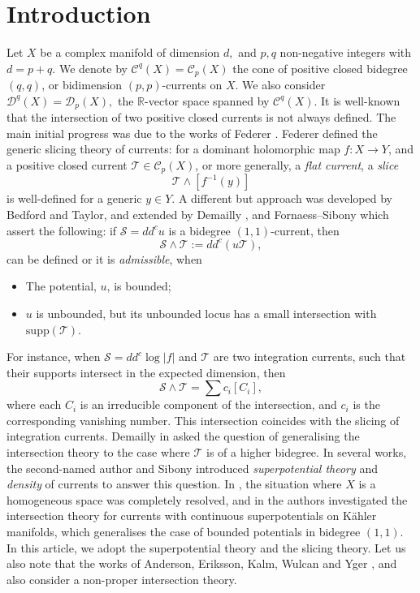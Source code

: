 \documentclass[11pt]{amsart}
\theoremstyle{definition}
\newcommand{\R}{\mathbb{R}}
\newcommand{\lto}{\longrightarrow}
\newcommand{\sD}{\mathscr{D}}
\newcommand{\sC}{\mathscr{C}}
\newcommand{\cC}{\mathcal{C}}
\newcommand{\sT}{\mathscr{T}}
\newcommand{\sS}{\mathscr{S}}
\newcommand{\supp}[1]{{\mathrm{supp}(#1)}}
\begin{document}
\section{Introduction}
Let $X$ be a complex manifold of dimension $d,$ and $p,q$ non-negative integers with $d= p+q.$ We denote by $\cC^{q}(X)= \cC_{p}(X)$ the cone of positive closed bidegree $(q,q)$, or bidimension $(p,p)$-currents on $X.$ We also consider $\sD^q(X) = \sD_p(X),$ the $\R$-vector space spanned by $\sC^q(X).$ It is well-known that the intersection of two positive closed currents is not always defined. The main initial progress was due to the works of Federer \cite{Federer}. Federer defined the generic slicing theory of currents: for a dominant holomorphic map $f: X \lto Y$, and a positive closed current $\sT\in \cC_p(X) $, or more generally, a \emph{flat current}, a \emph{slice}
$$
\sT\wedge [f^{-1}(y)]   
$$
is well-defined for a generic $y \in Y.$ A different but approach was developed by Bedford and Taylor, and extended by Demailly \cite{Dem-analytic1}, and Fornaess--Sibony \cite{Fornaess-Sibony} which assert the following: if $\sS= dd^c u$ is a bidegree $(1,1)$-current, then 
$$
\sS \wedge \sT := dd^c(u \sT),
$$
can be defined or it is \emph{admissible}, when 
\begin{itemize}
    \item The potential, $u$, is bounded;
    \item $u$ is unbounded, but its unbounded locus has a small intersection with $\supp{\sT}.$
\end{itemize}
For instance, when $\sS = dd^c \log|f|$ and $\sT$ are two integration currents, such that their supports 
intersect in the expected dimension, then 
$$
\sS \wedge \sT = \sum c_i [C_i],
$$
where each $C_i$ is an irreducible component of the intersection, and $c_i$ is the corresponding vanishing number. This intersection coincides with the slicing of integration currents. 
\vskip 2mm
Demailly in \cite{Dem-gaz} asked the question of generalising the intersection theory to the case where $\sT$ is of a higher bidegree. In several works, the second-named author and Sibony introduced \emph{superpotential theory} and \emph{density} of currents to answer this question. In \cite{Dinh-Sibony:superpot}, the situation where $X$ is a homogeneous space was completely resolved, and in \cite{Dinh-Sibony:Kahler} the authors investigated the intersection theory for currents with continuous superpotentials on K\"ahler manifolds, which generalises the case of bounded potentials in bidegree $(1,1)$. In this article, we adopt the superpotential theory and the slicing theory. Let us also note that the works of Anderson, Eriksson, Kalm, Wulcan and Yger \cite{Yger-et-al}, and \cite{Anderson--Kalm--Wulcan} also consider a non-proper intersection theory.
\end{document}
